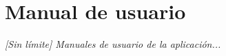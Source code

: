 \appendix
\chapter{Manual de usuario}
\label{app:manual}

\textit{[Sin límite] Manuales de usuario de la aplicación...}

